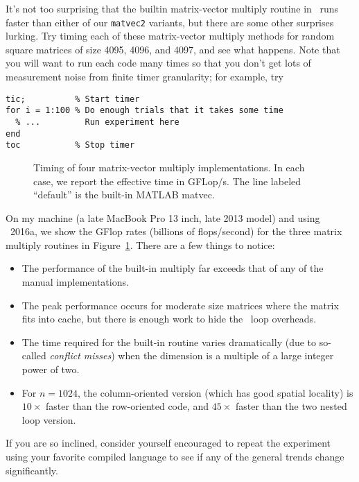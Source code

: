 \documentclass[12pt, leqno]{article} %
\begin{document}
It's not too surprising that the builtin matrix-vector multiply routine in
\matlab\ runs faster than either of our {\tt matvec2} variants, but there
are some other surprises lurking.  Try timing each of these matrix-vector
multiply methods for random square matrices of size 4095, 4096, and 4097,
and see what happens.  Note that you will want to run each code many times
so that you don't get lots of measurement noise from finite timer granularity;
for example, try
\begin{lstlisting}
tic;          % Start timer
for i = 1:100 % Do enough trials that it takes some time
  % ...         Run experiment here
end
toc           % Stop timer
\end{lstlisting}

\begin{figure} \label{fig:matvec-time}
  \caption{Timing of four matrix-vector multiply implementations.
    In each case, we report the effective time in GFLop/s.
    The line labeled ``default'' is the built-in MATLAB matvec.}
\end{figure}

On my machine (a late MacBook Pro 13 inch, late 2013 model) and
using \matlab\ 2016a, we show the GFlop rates (billions of flops/second)
for the three matrix multiply routines in Figure~\ref{fig:matvec-time}.
There are a few things to notice:
\begin{itemize}
\item The performance of the built-in multiply far exceeds that
  of any of the manual implementations.
\item The peak performance occurs for moderate size matrices where
  the matrix fits into cache, but there is enough work to hide
  the \matlab\ loop overheads.
\item The time required for the built-in routine varies dramatically
  (due to so-called {\em conflict misses}) when the dimension is
  a multiple of a large integer power of two.
\item For $n = 1024$, the column-oriented version (which has good spatial
  locality) is $10\times$ faster than the row-oriented code,
  and $45\times$ faster than the two nested loop version.
\end{itemize}
If you are so inclined, consider yourself encouraged to repeat the
experiment using your favorite compiled language to see if any of the
general trends change significantly.
\end{document}
